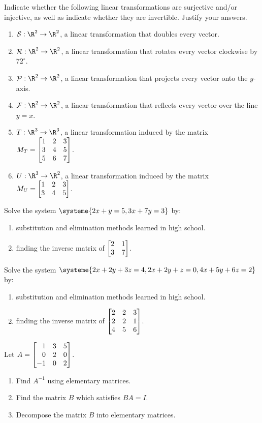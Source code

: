 \begin{exercises}
	\begin{problist}
		\prob  Indicate whether the following linear transformations are surjective and/or injective, as well as indicate whether they are invertible. Justify your answers.
		\begin{enumerate}
			\item   $\mathcal S:\R^2\to\R^2$, a linear transformation that doubles every vector.
			\item   $\mathcal R:\R^2\to\R^2$, a linear transformation that rotates every vector clockwise by $72^\circ$.
			\item   $\mathcal P:\R^2\to\R^2$, a linear transformation that projects every vector onto the $y$-axis.
			\item   $\mathcal F:\R^2\to\R^2$, a linear transformation that reflects every vector over the line $y=x$.
			\item   $T:\R^3\to\R^3$, a linear transformation induced by the matrix $M_T = \mat{1&2&3\\3&4&5\\5&6&7}$.
			\item   $U:\R^3\to\R^2$, a linear transformation induced by the matrix $M_U = \mat{1&2&3\\3&4&5}$.
		\end{enumerate}
		
		\prob Solve the system $\systeme{2x+y=5,3x+7y=3}$ by:
		    \begin{enumerate}
		        \item   substitution and elimination methods learned in high school.
		        \item   finding the inverse matrix of $\mat{2&1\\3&7}$.
		    \end{enumerate}
		
		\prob Solve the system $\systeme{2x+2y+3z=4,2x+2y+z=0, 4x+5y+6z=2}$ by:
		    \begin{enumerate}
		        \item   substitution and elimination methods learned in high school.
		        \item   finding the inverse matrix of $\mat{2&2&3\\2&2&1\\4&5&6}$.
		    \end{enumerate}
		    
		\prob 	Let $A=\mat{1&3&5\\0&2&0\\-1&0&2}$. 
		    \begin{enumerate}
		        \item Find $A^{-1}$ using elementary matrices.
		        \item Find the matrix $B$ which satisfies $BA=I$.
		        \item Decompose the matrix $B$ into elementary matrices. 
		    \end{enumerate}  
	

\end{problist}
\end{exercises}
